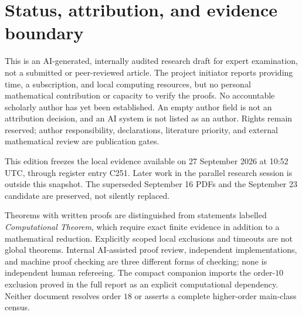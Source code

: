 \section*{Status, attribution, and evidence boundary}
This is an AI-generated, internally audited research draft for expert
examination, not a submitted or peer-reviewed article. The project initiator
reports providing time, a subscription, and local computing resources, but
no personal mathematical contribution or capacity to verify the proofs.
No accountable scholarly author has yet been established. An empty author
field is not an attribution decision, and an AI system is not listed as an
author. Rights remain reserved; author responsibility, declarations,
literature priority, and external mathematical review are publication gates.

This edition freezes the local evidence available on 27 September 2026
at 10:52 UTC, through register entry C251. Later work in the parallel
research session is outside this snapshot. The superseded September 16
PDFs and the September 23 candidate are preserved, not silently replaced.

Theorems with written proofs are distinguished from statements labelled
\emph{Computational Theorem}, which require exact finite evidence in
addition to a mathematical reduction. Explicitly scoped local exclusions
and timeouts are not global theorems. Internal AI-assisted proof review,
independent implementations, and machine proof checking are three different
forms of checking; none is independent human refereeing. The compact
companion imports the order-$10$ exclusion proved in the full report as an
explicit computational dependency. Neither document resolves order $18$ or
asserts a complete higher-order main-class census.
